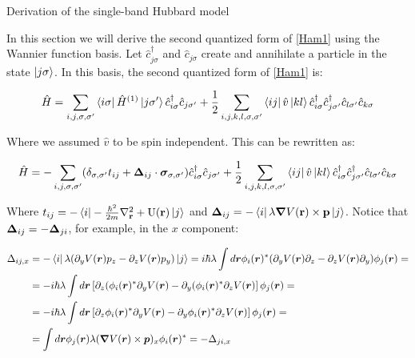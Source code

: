 \begin{section}{Derivation of the single-band Hubbard model}

In this section we will derive the second quantized form of \ref{Ham1} using the Wannier function basis. Let $\hat{c}_{j \sigma}^\dagger$ and $\hat{c}_{j \sigma}$ create and annihilate a particle in the state $\ket{j\sigma}$. In this basis, the second quantized form of \ref{Ham1} is:

\begin{equation}
\hat{H} = \sum_{i,j,\sigma, \sigma'} \bra{i\sigma} \hat{H}^{(1)} \ket{j\sigma'} \hat{c}_{i \sigma}^\dagger \hat{c}_{j \sigma'} + \frac{1}{2} \sum_{i,j,k,l, \sigma, \sigma'} \bra{ij} \hat{v} \ket{kl} \hat{c}_{i \sigma}^\dagger \hat{c}_{j \sigma'}^\dagger \hat{c}_{l \sigma'} \hat{c}_{k \sigma}
\end{equation}

Where we assumed $\hat{v}$ to be spin independent. This can be rewritten as:

\begin{equation}
\hat{H} = -\sum_{i,j,\sigma, \sigma'} (\delta_{\sigma, \sigma'} t_{ij} + \boldsymbol{\Delta}_{ij} \cdot\boldsymbol{\sigma}_{\sigma, \sigma'}) \hat{c}_{i \sigma}^\dagger \hat{c}_{j \sigma'} + \frac{1}{2} \sum_{i,j,k,l, \sigma, \sigma'} \bra{ij} \hat{v} \ket{kl} \hat{c}_{i \sigma}^\dagger \hat{c}_{j \sigma'}^\dagger \hat{c}_{l \sigma'} \hat{c}_{k \sigma}
\end{equation}

Where $t_{ij} = -\bra{i} -\frac{\hbar^2}{2m}\nabla^2_{\textbf{r}} + \text{U}(\textbf{r}) \ket{j}$ and $\boldsymbol{\Delta}_{ij} = -\bra{i} \lambda \boldsymbol{\nabla}V(\textbf{r}) \times \textbf{p} \ket{j}$. Notice that $\boldsymbol{\Delta}_{ij} = - \boldsymbol{\Delta}_{ji}$, for example, in the $x$ component:

\begin{align*}
\Delta_{ij,x} &= -\bra{i} \lambda (\partial_y V(\boldsymbol{r}) p_z - \partial_z V(\boldsymbol{r}) p_y) \ket{j} = i \hbar \lambda \int d \boldsymbol{r} \phi_i(\boldsymbol{r})^* (\partial_y V(\boldsymbol{r}) \partial_z - \partial_z V(\boldsymbol{r}) \partial_y) \phi_j(\boldsymbol{r}) = \\
&= -i\hbar\lambda \int d\boldsymbol{r} \left[ \partial_z(\phi_i(\boldsymbol{r})^*\partial_y V(\boldsymbol{r}) - \partial_y(\phi_i(\boldsymbol{r})^*\partial_z V(\boldsymbol{r}) \right] \phi_j(\boldsymbol{r}) = \\
&= -i\hbar\lambda \int d\boldsymbol{r} \left[ \partial_z \phi_i(\boldsymbol{r})^* \partial_y V(\boldsymbol{r}) - \partial_y \phi_i(\boldsymbol{r})^*\partial_z V(\boldsymbol{r}) \right] \phi_j(\boldsymbol{r}) = \\
&= \int d\boldsymbol{r} \phi_j(\boldsymbol{r}) \lambda (\boldsymbol{\nabla}V(\boldsymbol{r}) \times \boldsymbol{p})_x \phi_i(\boldsymbol{r})^* = - \Delta_{ji,x}
\end{align*}


\end{section}
